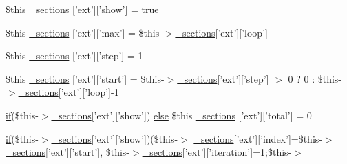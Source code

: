\begin{DoxyCompactItemize}
\item 
\$this \hyperlink{_06_06-72_05_06_06-727729411_05left__frame_8tpl_8php_ad8fe609931d6644c046439ca81b71ff1}{\-\_\-sections} \mbox{[}'ext'\mbox{]}\mbox{[}'show'\mbox{]} = true
\item 
\$this \hyperlink{_06_06-72_05_06_06-727729411_05left__frame_8tpl_8php_a9897323c262cd296dea4339fc4e79539}{\-\_\-sections} \mbox{[}'ext'\mbox{]}\mbox{[}'max'\mbox{]} = \$this-\/$>$\hyperlink{_06_06127_05_06_0612781687_05pkgelementindex_8tpl_8php_a9e3d26b39edfe29c3f29b8035ef33828}{\-\_\-sections}\mbox{[}'ext'\mbox{]}\mbox{[}'loop'\mbox{]}
\item 
\$this \hyperlink{_06_06-72_05_06_06-727729411_05left__frame_8tpl_8php_a9bd86c6aa63322dcb82e41f0e4717476}{\-\_\-sections} \mbox{[}'ext'\mbox{]}\mbox{[}'step'\mbox{]} = 1
\item 
\$this \hyperlink{_06_06-72_05_06_06-727729411_05left__frame_8tpl_8php_a40e813ad82ebd57c3fbd56b2b9641a86}{\-\_\-sections} \mbox{[}'ext'\mbox{]}\mbox{[}'start'\mbox{]} = \$this-\/$>$\hyperlink{_06_06127_05_06_0612781687_05pkgelementindex_8tpl_8php_a9e3d26b39edfe29c3f29b8035ef33828}{\-\_\-sections}\mbox{[}'ext'\mbox{]}\mbox{[}'step'\mbox{]} $>$ 0 ? 0 \-: \$this-\/$>$\hyperlink{_06_06127_05_06_0612781687_05pkgelementindex_8tpl_8php_a9e3d26b39edfe29c3f29b8035ef33828}{\-\_\-sections}\mbox{[}'ext'\mbox{]}\mbox{[}'loop'\mbox{]}-\/1
\item 
\hyperlink{_setup_8inc_8php_ad0184337b31d13763ec8751feff4aabe}{if}(\$this-\/$>$\hyperlink{_06_06127_05_06_0612781687_05pkgelementindex_8tpl_8php_a9e3d26b39edfe29c3f29b8035ef33828}{\-\_\-sections}\mbox{[}'ext'\mbox{]}\mbox{[}'show'\mbox{]}) \*
\hyperlink{test__session_8php_a7ca5c3b9e4c46ab37c0418e95ddcfa36}{else} \$this \hyperlink{_06_06-72_05_06_06-727729411_05left__frame_8tpl_8php_a8d25f96b23474b7b2fbadbd4dc497b67}{\-\_\-sections} \mbox{[}'ext'\mbox{]}\mbox{[}'total'\mbox{]} = 0
\item 
\hyperlink{_setup_8inc_8php_ad0184337b31d13763ec8751feff4aabe}{if}(\$this-\/$>$\hyperlink{_06_06127_05_06_0612781687_05pkgelementindex_8tpl_8php_a9e3d26b39edfe29c3f29b8035ef33828}{\-\_\-sections}\mbox{[}'ext'\mbox{]}\mbox{[}'show'\mbox{]})(\$this-\/$>$\*
\hyperlink{_06_06127_05_06_0612781687_05pkgelementindex_8tpl_8php_a9e3d26b39edfe29c3f29b8035ef33828}{\-\_\-sections}\mbox{[}'ext'\mbox{]}\mbox{[}'index'\mbox{]}=\$this-\/$>$\*
\hyperlink{_06_06127_05_06_0612781687_05pkgelementindex_8tpl_8php_a9e3d26b39edfe29c3f29b8035ef33828}{\-\_\-sections}\mbox{[}'ext'\mbox{]}\mbox{[}'start'\mbox{]}, \*
\$this-\/$>$\hyperlink{_06_06127_05_06_0612781687_05pkgelementindex_8tpl_8php_a9e3d26b39edfe29c3f29b8035ef33828}{\-\_\-sections}\mbox{[}'ext'\mbox{]}\mbox{[}'iteration'\mbox{]}=1;\$this-\/$>$\*

\end{DoxyCompactItemize}
